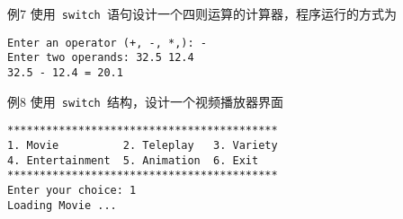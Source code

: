 \begin{frame}[fragile]\ft{\secname}
\begin{block}{例7}
使用\lstinline| switch |语句设计一个四则运算的计算器，程序运行的方式为
\begin{lstlisting}
Enter an operator (+, -, *,): -
Enter two operands: 32.5 12.4
32.5 - 12.4 = 20.1
\end{lstlisting}
\end{block}
\end{frame}

\begin{frame}[fragile]\ft{\secname}
\begin{block}{例8}
使用\lstinline| switch |结构，设计一个视频播放器界面
\begin{lstlisting}
****************************************** 
1. Movie          2. Teleplay   3. Variety   
4. Entertainment  5. Animation  6. Exit
******************************************
Enter your choice: 1
Loading Movie ...
\end{lstlisting}


\end{block}
\end{frame}